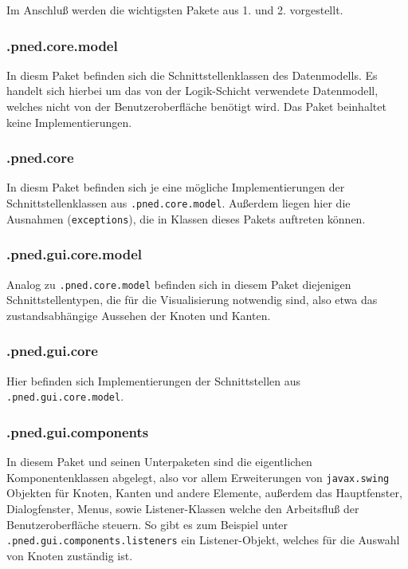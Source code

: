 \documentclass[11pt]{article}
\begin{document}
   Im Anschluß werden die wichtigsten Pakete
   aus 1. und 2. vorgestellt.
\subsubsection{.pned.core.model}
\label{sec-1-2-1}

      In diesm Paket befinden sich die Schnittstellenklassen des
      Datenmodells. Es handelt sich hierbei um das von der
      Logik-Schicht verwendete Datenmodell, welches nicht von der
      Benutzeroberfläche benötigt wird. Das Paket beinhaltet keine
      Implementierungen.
\subsubsection{.pned.core}
\label{sec-1-2-2}

     In diesm Paket befinden sich je eine mögliche Implementierungen
     der Schnittstellenklassen aus \verb|.pned.core.model|. Außerdem
     liegen hier die Ausnahmen (\verb|exceptions|), die in Klassen
     dieses Pakets auftreten können.
\subsubsection{.pned.gui.core.model}
\label{sec-1-2-3}

    Analog zu \verb|.pned.core.model| befinden sich in diesem Paket
    diejenigen Schnittstellentypen, die für die Visualisierung
    notwendig sind, also etwa das zustandsabhängige Aussehen der
    Knoten und Kanten.
\subsubsection{.pned.gui.core}
\label{sec-1-2-4}

    Hier befinden sich Implementierungen der Schnittstellen aus
    \verb|.pned.gui.core.model|.
\subsubsection{.pned.gui.components}
\label{sec-1-2-5}

    In diesem Paket und seinen Unterpaketen sind die eigentlichen
    Komponentenklassen abgelegt, also vor allem Erweiterungen von
    \verb|javax.swing| Objekten für Knoten, Kanten und andere
    Elemente, außerdem das Hauptfenster, Dialogfenster, Menus, sowie
    Listener-Klassen welche den Arbeitsfluß der Benutzeroberfläche
    steuern.  So gibt es zum Beispiel unter
    \verb|.pned.gui.components.listeners| ein Listener-Objekt, welches
    für die Auswahl von Knoten zuständig ist.
\end{document}
